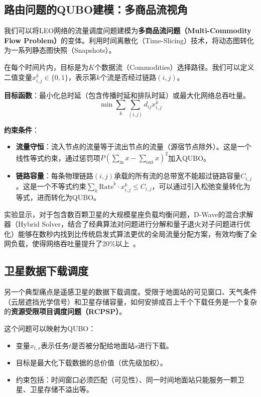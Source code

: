 \documentclass[12pt,a4paper]{article}
\begin{document}
\subsection{路由问题的QUBO建模：多商品流视角}

我们可以将LEO网络的流量调度问题建模为\textbf{多商品流问题（Multi-Commodity Flow Problem）}的变体。利用时间离散化（Time-Slicing）技术，将动态图转化为一系列静态图快照（Snapshots）。

在每个时间片内，目标是为$K$个数据流（Commodities）选择路径。我们可以定义二值变量$x_{i,j}^k \in \{0, 1\}$，表示第$k$个流是否经过链路$(i, j)$。

\textbf{目标函数}：最小化总时延（包含传播时延和排队时延）或最大化网络总吞吐量。
\begin{equation}
\min \sum_{k} \sum_{(i,j)} d_{ij} x_{i,j}^k
\end{equation}

\textbf{约束条件}：
\begin{itemize}
    \item \textbf{流量守恒}：流入节点的流量等于流出节点的流量（源宿节点除外）。这是一个线性等式约束，通过惩罚项$P(\sum_{\text{in}} x - \sum_{\text{out}} x)^2$加入QUBO。
    \item \textbf{链路容量}：每条物理链路$(i,j)$承载的所有流的总带宽不能超过链路容量$C_{i,j}$。这是一个不等式约束$\sum_k \text{Rate}^k \cdot x_{i,j}^k \le C_{i,j}$，可以通过引入松弛变量转化为等式，进而转化为QUBO。
\end{itemize}

实验显示，对于包含数百颗卫星的大规模星座负载均衡问题，D-Wave的混合求解器（Hybrid Solver，结合了经典算法对问题进行分解和量子退火对子问题进行优化）能够在数秒内找到比传统启发式算法更优的全局流量分配方案，有效均衡了全网负载，使得网络吞吐量提升了20\%以上~\cite{ref10}。

\subsection{卫星数据下载调度}

另一个典型痛点是遥感卫星的数据下载调度。受限于地面站的可见窗口、天气条件（云层遮挡光学信号）和卫星存储容量，如何安排成百上千个下载任务是一个复杂的\textbf{资源受限项目调度问题（RCPSP）}。

这个问题可以映射为QUBO：
\begin{itemize}
    \item 变量$x_{t, s}$表示任务$t$是否被分配给地面站$s$进行下载。
    \item 目标是最大化下载数据的总价值（优先级加权）。
    \item 约束包括：时间窗口必须匹配（可见性）、同一时间地面站只能服务一颗卫星、卫星存储不溢出等。
\end{itemize}
\end{document}
